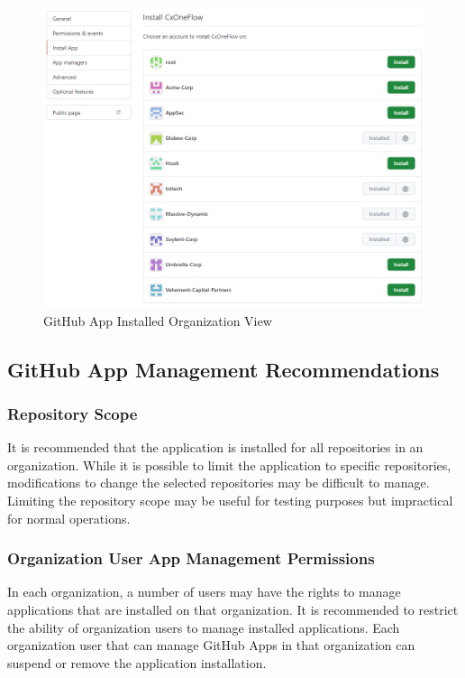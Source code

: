 \begin{figure}[ht]
    \includegraphics[width=\textwidth]{graphics/gh-app-deploy-4.png}
    \caption{GitHub App Installed Organization View}
    \label{fig:gh-app-deploy-4}
\end{figure}

\FloatBarrier

\subsection{GitHub App Management Recommendations}

\subsubsection{Repository Scope}

It is recommended that the application is installed for all repositories in an organization.  While it is possible to limit the
application to specific repositories, modifications to change the selected repositories may be difficult to manage.  Limiting
the repository scope may be useful for testing purposes but impractical for normal operations.

\subsubsection{Organization User App Management Permissions}

In each organization, a number of users may have the rights to manage applications that are installed on that organization.  It is
recommended to restrict the ability of organization users to manage installed applications.  Each organization user that can manage
GitHub Apps in that organization can suspend or remove the \cxoneflow application installation.

